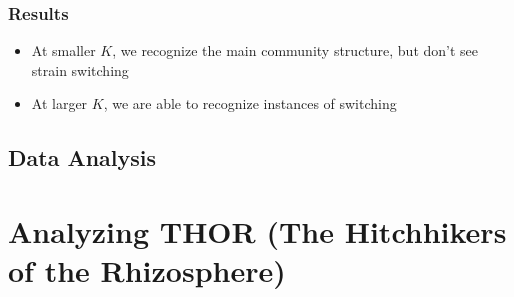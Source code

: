 \documentclass{beamer}
\begin{document}
\begin{frame}
  \frametitle{Results}
  \begin{itemize}
    \item At smaller $K$, we recognize the main community structure, but don't see strain switching
    \item At larger $K$, we are able to recognize instances of switching
  \end{itemize}
\end{frame}

\subsection{Data Analysis}

\section{Analyzing THOR (The Hitchhikers of the Rhizosphere)}
\end{document}
